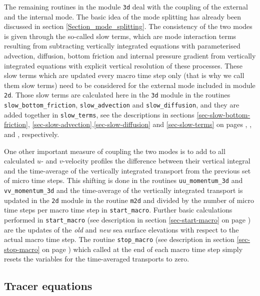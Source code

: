 The remaining routines in the module {\tt 3d} deal with the coupling of the
external and the internal mode. The basic idea of the mode splitting
has already been discussed in section \ref{Section_mode_splitting}.
The consistency of the two modes is given through the so-called
slow terms, which are mode interaction terms resulting from
subtracting vertically integrated equations with parameterised 
advection, diffusion, bottom friction and internal pressure 
gradient from vertically integrated equations with explicit vertical resolution
of these processes. These slow terms which are updated every macro
time step only (that is why we call them slow terms) need to be considered
for the external mode included in module {\tt 2d}.
Those slow terms are calculated here in the {\tt 3d} module in the routines
{\tt slow\_bottom\_friction}, {\tt slow\_advection} 
and {\tt slow\_diffusion}, and they are added together in {\tt slow\_terms},
see the descriptions in sections \ref{sec-slow-bottom-friction}, 
\ref{sec-slow-advection},\ref{sec-slow-diffusion} and \ref{sec-slow-terms}
on pages \pageref{sec-slow-bottom-friction}, 
\pageref{sec-slow-advection},\pageref{sec-slow-diffusion} and 
\pageref{sec-slow-terms},
respectively.

One other important measure of coupling the two modes is to
add to all calculated $u$- and $v$-velocity profiles the difference 
between their vertical integral and the time-average of the 
vertically integrated transport from the previous set of micro time 
steps. This shifting is done in the routines {\tt uu\_momentum\_3d} and
{\tt vv\_momentum\_3d} and the  time-average of the
vertically integrated transport is updated in the {\tt 2d} module 
in the routine {\tt m2d} and divided by the number of
micro time steps per macro time step in {\tt start\_macro}. 
Further basic calculations performed in {\tt start\_macro}
(see description in section \ref{sec-start-macro} 
on page \pageref{sec-start-macro}) are the updates of
the {\it old} and {\it new} sea surface elevations with respect to 
the actual macro time step.
The routine {\tt stop\_macro} (see description in section \ref{sec-stop-macro}
on page \pageref{sec-stop-macro}) 
which called at the end of each macro time step
simply resets the variables for the time-averaged transports to zero. 

\subsection{Tracer equations}\label{Section_tracer}

